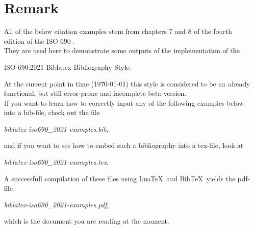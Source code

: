 \documentclass[11pt, a4paper, bibliography=leveldown]{scrreprt}
\begin{document}
\section*{Remark}
All of the below citation examples stem from chapters 7 and 8 of the fourth
edition of the ISO 690 \parencite[see][ch.~7--8]{ISO}.\\
They are used here to demonstrate some outputs of the implementation of the
\begin{center}
\textsf{\Large{ISO 690:2021 Biblatex Bibliography Style.}}
\end{center}
At the current point in time (\today) this style is considered to be an already
functional, but still error-prone and incomplete beta version.\\
If you want to learn how to correctly input any of the following examples
below into a bib-file, check out the file
\begin{center}
\textit{biblatex-iso690\_2021-examples.bib},
\end{center}
and if you want to see how to embed such a bibliography into a tex-file, look at
\begin{center}
\textit{biblatex-iso690\_2021-examples.tex}.
\end{center}
A successfull compilation of these files using Lua\TeX\ and Bib\TeX\ yields
the pdf-file
\begin{center}
\textit{biblatex-iso690\_2021-examples.pdf},
\end{center}
which is the document you are reading at the moment.

\vspace{4\baselineskip}
\printbibliography[heading=remarks,keyword=remark]
\newpage


\setlength{\emergencystretch}{2em}
\begingroup
\printbibliography[heading=chap7-1,keyword=general]
\newpage
\printbibliography[heading=chap7-2,keyword=creator]
\printbibliography[heading=chap7-3,keyword=title]
\newpage
\printbibliography[heading=chap7-4,keyword=component_parts]
\printbibliography[heading=chap7-5,keyword=formats_and_resource_types]
\printbibliography[heading=chap7-6,keyword=edition_and_version]
\newpage
\printbibliography[heading=chap7-7,keyword=date]
\printbibliography[heading=chap7-8,keyword=production_information]
\printbibliography[heading=chap7-9,keyword=numeration_and_pagination]
\printbibliography[heading=chap7-10,keyword=serials_and_series]
\newpage
\printbibliography[heading=chap7-11,keyword=identifiers]
\newpage
\printbibliography[heading=chap7-12,keyword=availability_and_location]
\newpage
\printbibliography[heading=chap7-13,keyword=item_and_event_attributes]
\newpage
\printbibliography[heading=chap7-14,keyword=relationship]
\printbibliography[heading=chap7-15,keyword=other_elements]
\newpage
\printbibliography[heading=chap8,keyword=resource_categories]
\endgroup
\end{document}
